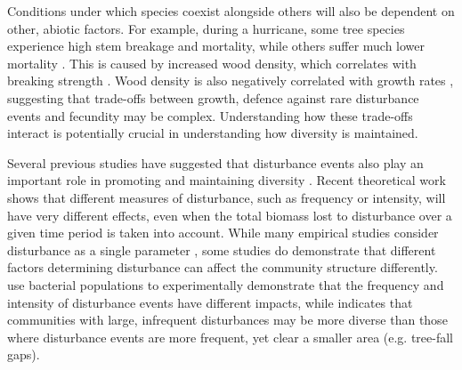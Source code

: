 Conditions under which species coexist alongside others will also be dependent on other, abiotic factors. For example, during a hurricane, some tree species experience high stem breakage and mortality, while others suffer much lower mortality \citep{zimmerman1994responses}. This is caused by increased wood density, which correlates with breaking strength \citep{niklas1992plant}. Wood density is also negatively correlated with growth rates \citep{king2005tree}, suggesting that trade-offs between growth, defence against rare disturbance events and fecundity may be complex. Understanding how these trade-offs interact is potentially crucial in understanding how diversity is maintained.

Several previous studies have suggested that disturbance events also play an important role in promoting and maintaining diversity \citep[e.g.][]{sousa1984role,denslow1987tropical}.  Recent theoretical work \citep[Chapter~1;][]{miller2011frequency,nattrass2012quantifying} shows that different measures of disturbance, such as frequency or intensity, will have very different effects, even when the total biomass lost to disturbance over a given time period is taken into account. While many empirical studies consider disturbance as a single parameter \citep[e.g.][]{molino2001tree,peterson1997tornado,nakagawa2000impact}, some studies do demonstrate that different factors determining disturbance can affect the community structure differently. \cite{hall2012diversity} use bacterial populations to experimentally demonstrate that the frequency and intensity of disturbance events have different impacts, while \cite{denslow1980patterns} indicates that communities with large, infrequent disturbances may be more diverse than those where disturbance events are more frequent, yet clear a smaller area (e.g. tree-fall gaps).

